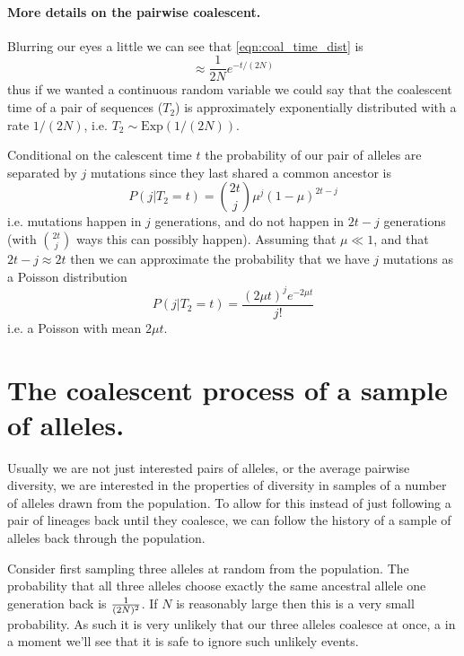 \paragraph{More details on the pairwise coalescent.}

Blurring our eyes a little we can see  that \ref{eqn:coal_time_dist} is
\begin{equation}
\approx \frac{1}{2N} e^{-t/(2N)} 
\end{equation}
thus if we wanted a continuous random variable we could say that the coalescent time of a pair of sequences ($T_2$) is
approximately exponentially distributed with a rate $1/(2N)$, i.e. $T_2 \sim \text{Exp}\left( 1/(2N) \right)$. 


Conditional on the calescent time $t$ the probability of our pair of alleles are separated by $j$ mutations
since they last shared a common ancestor is
\begin{equation}
P(j | T_2 = t ) = {2t \choose j} \mu^{j} (1-\mu)^{2t-j}
\end{equation}
i.e. mutations happen in $j$ generations, and do not happen in $2t-j$
generations (with ${2t \choose j}$ ways this can possibly
happen). Assuming that $\mu \ll 1$, and that $2t-j \approx 2t$ then we
can approximate the probability that we have $j$ mutations as a
Poisson distribution
\begin{equation}
P(j | T_2 = t ) = \frac{ (2 \mu t )^{j} e^{-2\mu t}}{j!}
\end{equation}
i.e. a Poisson with mean $2\mu t $. \\


\section{The coalescent process of a sample of alleles.}

Usually we are not just interested pairs of alleles, or the
average pairwise diversity, we are interested in the properties of
diversity in samples of a number of alleles drawn from the population.  
To allow for this instead of just following a pair of lineages back until they
coalesce, we can follow the history of a sample of alleles back
through the population.

Consider first sampling three alleles at random from the population. The
probability that all three alleles choose exactly the same ancestral allele one
generation back is $\nicefrac{1}{(2N)^2}$. If $N$ is reasonably large then this
is a very small probability. As such it is very unlikely that our three alleles
coalesce at once, a in a moment we'll see that it is safe to ignore such
unlikely events. \\

